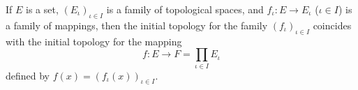 If $E$ is a set, $(E_\iota)_{\iota \in I}$ is a family of topological spaces, and $f_\iota: E \to E_\iota$ ($\iota \in I$) is a family of mappings, then the initial topology for the family $(f_\iota)_{\iota \in I}$ coincides with the initial topology for the mapping
$$f: E \to F = \prod_{\iota \in I} E_\iota$$
defined by $f(x) = (f_\iota(x))_{\iota \in I}$.
